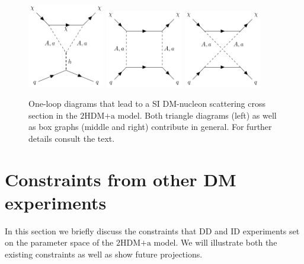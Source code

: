 \documentclass[a4paper, 11pt,notoc]{article}
\newcommand{\hdma}{\ensuremath{\textrm{2HDM+a}}\xspace}
\begin{document}

\begin{figure}[t!]
    \centering
    \includegraphics[width=0.3\textwidth]{pseudoTriangle.pdf} \quad 
    \includegraphics[width=0.3\textwidth]{pseudoBox.pdf} \quad 
    \includegraphics[width=0.3\textwidth]{pseudoBox2.pdf} 
    \vspace{4mm}
    \caption{One-loop diagrams that lead to a SI DM-nucleon scattering cross section in the \hdma model.  Both triangle diagrams (left) as well as box graphs (middle and right) contribute in general. For further details consult the text. }
    \label{fig:feynDDPS}
\end{figure}

\section{Constraints from other DM experiments}
\label{sec:DMdetection}

In this section we briefly discuss the constraints that DD and ID experiments set on the parameter space of the \hdma model. We will illustrate both the existing constraints as well as show future projections. 
\end{document}
